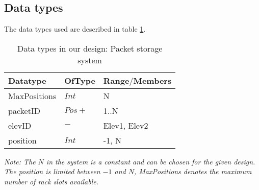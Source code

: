 \subsection*{Data types}
The data types used are described in table \ref{tab: data_types}.
\begin{table}[h]
\centering
\begin{tabular}{|l|l|l|}\hline
Datatype & OfType & Range$\slash$Members\\\hline
MaxPositions & $Int$ & {N} \\\hline
packetID & $Pos+$ & { 1..N} \\\hline
elevID & $ - $ & { Elev1, Elev2}\\\hline
position & $Int$ & {-1, N}\\\hline
\end{tabular}
\caption{Data types in our design: Packet storage system }
\label{tab: data_types}
\end{table}

\textit{Note: The $N$ in the system is a constant and can be chosen for the given design. The position is limited between $-1$ and $N$, \textit{MaxPositions} denotes the maximum number of rack slots available.}